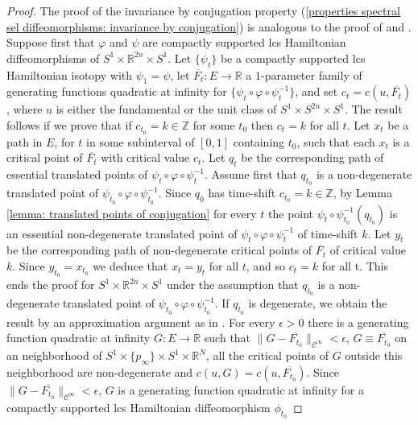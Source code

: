 \documentclass{amsart}
\theoremstyle{remark}
\begin{document}
\begin{proof}
The proof of the invariance by conjugation property
(\ref{properties spectral sel diffeomorphisms: invariance by conjugation})
is analogous to the proof of \cite[Theorem 1.1 (i)]{Bhupal}
and \cite[Lemma 3.16]{San11}.
Suppose first that $\varphi$ and $\psi$
are compactly supported lcs Hamiltonian diffeomorphisms
of $S^1 \times \mathbb{R}^{2n} \times S^1$.
Let $\{\psi_t\}$ be a compactly supported lcs Hamiltonian isotopy
with $\psi_1 = \psi$,
let $\overline{F_t}: E \rightarrow \mathbb{R}$
a $1$-parameter family of generating functions quadratic at infinity
for $\{\psi_t \circ \varphi \circ \psi_t^{-1} \}$,
and set $c_t = c (u, \overline{F_t})$,
where $u$ is either the fundamental or the unit class of $S^1 \times S^{2n} \times S^1$.
The result follows if we prove that
if $c_{t_0} = k \in \mathbb{Z}$ for some $t_0$
then $c_t = k$ for all $t$.
Let $x_t$ be a path in $E$,
for $t$ in some subinterval of $[0, 1]$ containing $t_0$,
such that each $x_t$ is a critical point of $\overline{F_t}$
with critical value $c_t$.
Let $q_t$ be the corresponding path of essential translated points
of $\psi_t \circ \varphi \circ \psi_t^{-1}$.
Assume first that $q_{t_0}$ is a non-degenerate translated point
of $\psi_{t_0} \circ \varphi \circ \psi_{t_0}^{-1}$.
Since $q_0$ has time-shift $c_{t_0} = k \in \mathbb{Z}$,
by Lemma \ref{lemma: translated points of conjugation}
for every $t$ the point $\psi_t \circ \psi_{t_0}^{-1} (q_{t_0})$
is an essential non-degenerate translated point
of $\psi_t \circ \varphi \circ \psi_t^{-1}$
of time-shift $k$.
Let $y_t$ be the corresponding path of non-degenerate critical points
of $\overline{F_t}$ of critical value $k$.
Since $y_{t_0} = x_{t_0}$
we deduce that $x_t = y_t$ for all $t$,
and so $c_t = k$ for all t.
This ends the proof for $S^1 \times \mathbb{R}^{2n} \times S^1$
under the assumption that $q_{t_0}$
is a non-degenerate translated point
of $\psi_{t_0} \circ \varphi \circ \psi_{t_0}^{-1}$.
If $q_{t_0}$ is degenerate,
we obtain the result by an approximation argument as in \cite{Bhupal}.
For every $\epsilon > 0$
there is a generating function quadratic at infinity
$G: E \rightarrow \mathbb{R}$
such that $\lVert G - \overline{F_{t_0}} \rVert_{\mathcal{C}^{\infty}} < \epsilon$,
$G \equiv \overline{F_{t_0}}$ on an neighborhood
of $S^1 \times \{p_{\infty}\} \times S^1 \times \mathbb{R}^N$,
all the critical points of $G$ outside this neighborhood are non-degenerate
and $c (u, G) = c (u, \overline{F_{t_0}})$.
Since $\lVert G - \overline{F_{t_0}} \rVert_{\mathcal{C}^{\infty}} < \epsilon$,
$G$ is a generating function quadratic at infinity
for a compactly supported lcs Hamiltonian diffeomorphism $\phi_{t_0}$

\end{proof}
\end{document}
